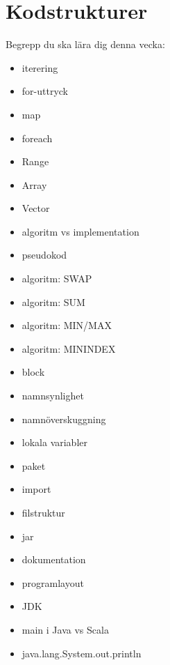 \chapter{Kodstrukturer}\label{chapter:W02}
Begrepp du ska lära dig denna vecka:
\begin{itemize}[noitemsep,label={$\square$},leftmargin=*]
\item iterering
\item for-uttryck
\item map
\item foreach
\item Range
\item Array
\item Vector
\item algoritm vs implementation
\item pseudokod
\item algoritm: SWAP
\item algoritm: SUM
\item algoritm: MIN/MAX
\item algoritm: MININDEX
\item block
\item namnsynlighet
\item namnöverskuggning
\item lokala variabler
\item paket
\item import
\item filstruktur
\item jar
\item dokumentation
\item programlayout
\item JDK
\item main i Java vs Scala
\item java.lang.System.out.println\end{itemize}
